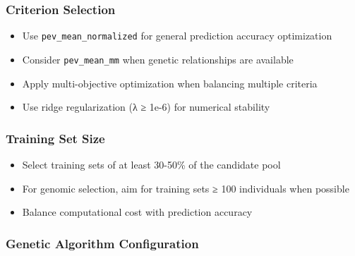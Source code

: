 \documentclass[
]{article}
\providecommand{\tightlist}{%
  \setlength{\itemsep}{0pt}\setlength{\parskip}{0pt}}
\begin{document}
\subsubsection{Criterion Selection}\label{criterion-selection}

\begin{itemize}
\tightlist
\item
  Use \texttt{pev\_mean\_normalized} for general prediction accuracy
  optimization
\item
  Consider \texttt{pev\_mean\_mm} when genetic relationships are
  available
\item
  Apply multi-objective optimization when balancing multiple criteria
\item
  Use ridge regularization (λ ≥ 1e-6) for numerical stability
\end{itemize}

\subsubsection{Training Set Size}\label{training-set-size}

\begin{itemize}
\tightlist
\item
  Select training sets of at least 30-50\% of the candidate pool
\item
  For genomic selection, aim for training sets ≥ 100 individuals when
  possible
\item
  Balance computational cost with prediction accuracy
\end{itemize}

\subsubsection{Genetic Algorithm
Configuration}\label{genetic-algorithm-configuration}
\end{document}

